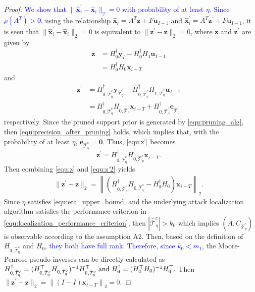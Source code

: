 \begin{proof}
\textcolor{blue}{We show that $\|\hat{\mathbf{x}}_i^{'}-\hat{\mathbf{x}}_i\|_2 = 0$ with probability of at least $\eta$. Since $\rho(A^{T})>0$,} using the relationship $\hat{\mathbf{x}}_i = A^T\mathbf{z}+F\mathbf{u}_{I-1}$ and $\hat{\mathbf{x}}_i^{'} = A^T \mathbf{z}^{'}+F\mathbf{u}_{I-1}$, it is seen that $\|\hat{\mathbf{x}}_i^{'}-\hat{\mathbf{x}}_i\|_2 = 0$ is equivalent to $\|\mathbf{z}^{'}-\mathbf{z}\|_2 = 0$, where $\mathbf{z}$ and $\mathbf{z}^{'}$ are given by 
\begin{align}
    \mathbf{z} &= H_0^\dagger\mathbf{y}_{I} - H_0^\dagger H_1\mathbf{u}_{I-1} \nonumber \\
    & = H_0^\dagger H_0 \mathbf{x}_{i-T} \label{equ:z}
\end{align}
and
\begin{align}
    \mathbf{z}^{'} &= H_{0,\hat{\mathcal{T}}_{\eta}^c}^\dagger\mathbf{y}_{\hat{\mathcal{T}}_{\eta}^c} - H_{0,\hat{\mathcal{T}}_{\eta}^c}^\dagger H_{1,\hat{\mathcal{T}}_{\eta}^c}\mathbf{u}_{I-1} \nonumber \\
    &= H_{0,\hat{\mathcal{T}}_{\eta}^c}^\dagger H_{0,\hat{\mathcal{T}}_{\eta}^c}  \mathbf{x}_{i-T} + H_{0,\hat{\mathcal{T}}_{\eta}^c}^\dagger \mathbf{e}_{\hat{\mathcal{T}}_{\eta}^c} \label{equ:z'}
\end{align}
respectively. Since the pruned support prior is generated by \eqref{equ:pruning_alg}, then \eqref{equ:precision_after_pruning} holds, which implies that, with the probability of at least $\eta$, $\mathbf{e}_{\hat{\mathcal{T}}_{\eta}^c} = \mathbf{0}$. Thus, \eqref{equ:z'} becomes
\begin{equation}\label{equ:z'2}
    \mathbf{z}^{'} = H_{0,\hat{\mathcal{T}}_{\eta}^c}^\dagger H_{0,\hat{\mathcal{T}}_{\eta}^c}  \mathbf{x}_{i-T}.
\end{equation}
Then combining \eqref{equ:z} and \eqref{equ:z'2} yields
\begin{align}
    \|\mathbf{z}^{'}-\mathbf{z}\|_2 = \left\|(H_{0,\hat{\mathcal{T}}_{\eta}^c}^\dagger H_{0,\hat{\mathcal{T}}_{\eta}^c}-H_0^\dagger H_0) \mathbf{x}_{i-T} \right\|_2.
\end{align}
Since $\eta$ satisfies \eqref{equ:eta_upper_bound} and the underlying attack localization algorithm satisfies the performance criterion in \eqref{equ:localization_performance_criterion}, then $ |\hat{\mathcal{T}}_{\eta}^c|> k_0$ which implies $(A,C_{\hat{\mathcal{T}}_{\eta}^c})$ is observable according to the assumption A2. Then, based on the definition of $H_{0,\hat{\mathcal{T}}_{\eta}^c}$ and $H_0$, \textcolor{blue}{they both have full rank. Therefore, since $k_0<m_1$,} the Moore-Penrose pseudo-inverses can be directly calculated as
$
    H_{0,\hat{\mathcal{T}}_{\eta}^c}^\dagger = (H_{0,\hat{\mathcal{T}}_{\eta}^c}^{\top} H_{0,\hat{\mathcal{T}}_{\eta}^c})^{-1}H_{0,\hat{\mathcal{T}}_{\eta}^c}^{\top} \hspace{1mm} \text{and}  \hspace{1mm} 
    H_0^\dagger = (H_0^{\top}H_0)^{-1}H_0^{\top}.
$
Then 
$  \|\mathbf{z}^{'}-\mathbf{z}\|_2 = \left\|(I-I) \mathbf{x}_{i-T} \right\|_2 =0.
$
\end{proof}

